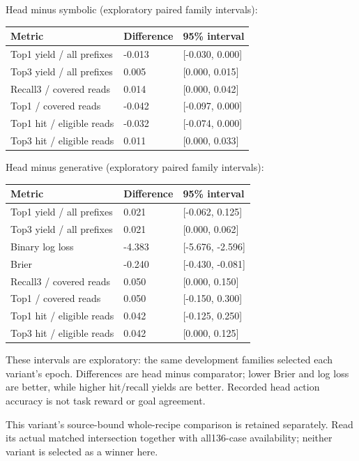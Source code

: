 \documentclass[10pt]{article}
\begin{document}
Head minus symbolic (exploratory paired family intervals):

\begin{longtable}[]{@{}lll@{}}
\toprule\noalign{}
Metric & Difference & 95\% interval \\
\midrule\noalign{}
\endhead
\bottomrule\noalign{}
\endlastfoot
Top1 yield / all prefixes & -0.013 & {[}-0.030, 0.000{]} \\
Top3 yield / all prefixes & 0.005 & {[}0.000, 0.015{]} \\
Recall3 / covered reads & 0.014 & {[}0.000, 0.042{]} \\
Top1 / covered reads & -0.042 & {[}-0.097, 0.000{]} \\
Top1 hit / eligible reads & -0.032 & {[}-0.074, 0.000{]} \\
Top3 hit / eligible reads & 0.011 & {[}0.000, 0.033{]} \\
\end{longtable}

Head minus generative (exploratory paired family intervals):

\begin{longtable}[]{@{}lll@{}}
\toprule\noalign{}
Metric & Difference & 95\% interval \\
\midrule\noalign{}
\endhead
\bottomrule\noalign{}
\endlastfoot
Top1 yield / all prefixes & 0.021 & {[}-0.062, 0.125{]} \\
Top3 yield / all prefixes & 0.021 & {[}0.000, 0.062{]} \\
Binary log loss & -4.383 & {[}-5.676, -2.596{]} \\
Brier & -0.240 & {[}-0.430, -0.081{]} \\
Recall3 / covered reads & 0.050 & {[}0.000, 0.150{]} \\
Top1 / covered reads & 0.050 & {[}-0.150, 0.300{]} \\
Top1 hit / eligible reads & 0.042 & {[}-0.125, 0.250{]} \\
Top3 hit / eligible reads & 0.042 & {[}0.000, 0.125{]} \\
\end{longtable}

These intervals are exploratory: the same development families selected each variant's epoch. Differences are head minus comparator; lower Brier and log loss are better, while higher hit/recall yields are better. Recorded head action accuracy is not task reward or goal agreement.

This variant's source-bound whole-recipe comparison is retained separately. Read its actual matched intersection together with all136-case availability; neither variant is selected as a winner here.
\end{document}
